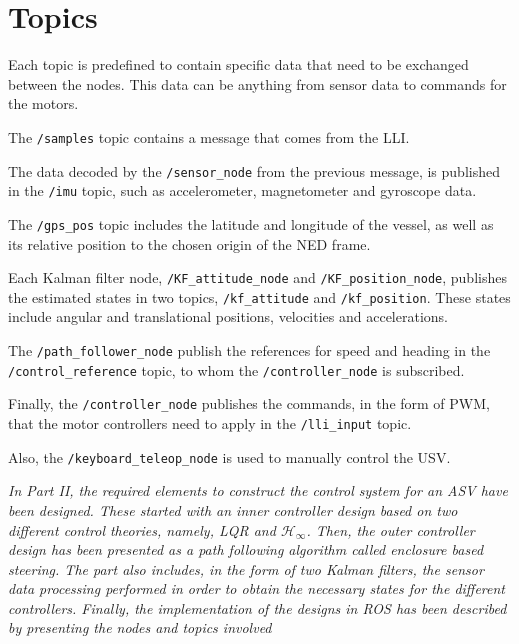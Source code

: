 \section{Topics}
Each topic is predefined to contain specific data that need to be exchanged between the nodes. This data can be anything from sensor data to commands for the motors.

The \lstinline[style=cinline]{/samples} topic contains a message that comes from the LLI.

The data decoded by the \lstinline[style=cinline]{/sensor_node} from the previous message, is published in the \lstinline[style=cinline]{/imu} topic, such as accelerometer, magnetometer and gyroscope data.

The \lstinline[style=cinline]{/gps_pos} topic includes the latitude and longitude of the vessel, as well as its relative position to the chosen origin of the NED frame.

Each Kalman filter node, \lstinline[style=cinline]{/KF_attitude_node} and \lstinline[style=cinline]{/KF_position_node}, publishes the estimated states in two topics, \lstinline[style=cinline]{/kf_attitude} and \lstinline[style=cinline]{/kf_position}. These states include angular and translational positions, velocities and accelerations.

The \lstinline[style=cinline]{/path_follower_node} publish the references for speed and heading in the \lstinline[style=cinline]{/control_reference} topic, to whom the \lstinline[style=cinline]{/controller_node} is subscribed.

Finally, the \lstinline[style=cinline]{/controller_node} publishes the commands, in the form of PWM, that the motor controllers need to apply in the \lstinline[style=cinline]{/lli_input} topic.

Also, the \lstinline[style=cinline]{/keyboard_teleop_node} is used to manually control the USV. 


\textit{In Part II, the required elements to construct the control system for an ASV have been designed. These started with an inner controller design based on two different control theories, namely, LQR and $\mathcal{H}_\infty$. Then, the outer controller design has been presented as a path following algorithm called enclosure based steering. The part also includes, in the form of two Kalman filters, the sensor data processing performed in order to obtain the necessary states for the different controllers. Finally, the implementation of the designs in ROS has been described by presenting the nodes and topics involved}